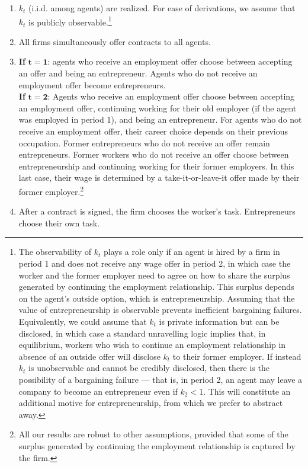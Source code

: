 \documentclass[12pt,american]{paper}
\theoremstyle{remark}
\begin{document}
\begin{enumerate}[(1)]\itemsep=0.05em
	\item $k_t$ (i.i.d. among agents) are realized. For ease of derivations, we assume that  $k_t$ is publicly observable.\footnote{ The observability of $k_t$ plays a role only if an agent is hired by a firm in period 1 and does not receive any wage offer in period 2, in which case the worker and the former employer need to agree on how to share the surplus generated by continuing the employment relationship. This surplus depends on the agent's outside option, which is entrepreneurship. Assuming that the value of entrepreneurship is observable prevents inefficient bargaining failures. Equivalently, we could assume that $k_t$ is private information but can be disclosed, in which case a standard unravelling logic implies that, in equilibrium, workers who wish to continue an employment relationship in absence of an outside offer will disclose $k_t$ to their former employer. If instead $k_t$ is unobservable and cannot be credibly disclosed, then there is the possibility of a bargaining failure --- that is, in period 2, an agent may leave a company to become an entrepreneur even if  $k_2<1$. This will constitute an additional motive for entrepreneurship, from which we prefer to abstract away. }
   \item All firms simultaneously offer contracts to all agents.  
    \item \textbf{If} $\mathbf{t=1}$: agents who receive an employment offer choose between accepting an offer and being an entrepreneur. Agents who do not receive an employment offer become entrepreneurs.\\
    \textbf{If}  $\mathbf{t=2}$: Agents who receive an employment offer choose between accepting an employment offer, continuing working for their old employer (if the agent was employed in period 1), and being an entrepreneur. For agents who do not receive an employment offer, their career choice depends on their previous occupation.  Former entrepreneurs who do not receive an offer remain entrepreneurs. Former workers  who do not receive an offer choose between entrepreneurship and continuing working for their former employers. In this last case, their  wage is determined by a take-it-or-leave-it offer made by their former employer.\footnote{All our results are robust to other assumptions, provided that some of the surplus generated by continuing the employment relationship is captured by the firm.}
    \item After a contract is signed, the firm chooses the worker's task. Entrepreneurs choose their own task.

\end{enumerate}
\end{document}
